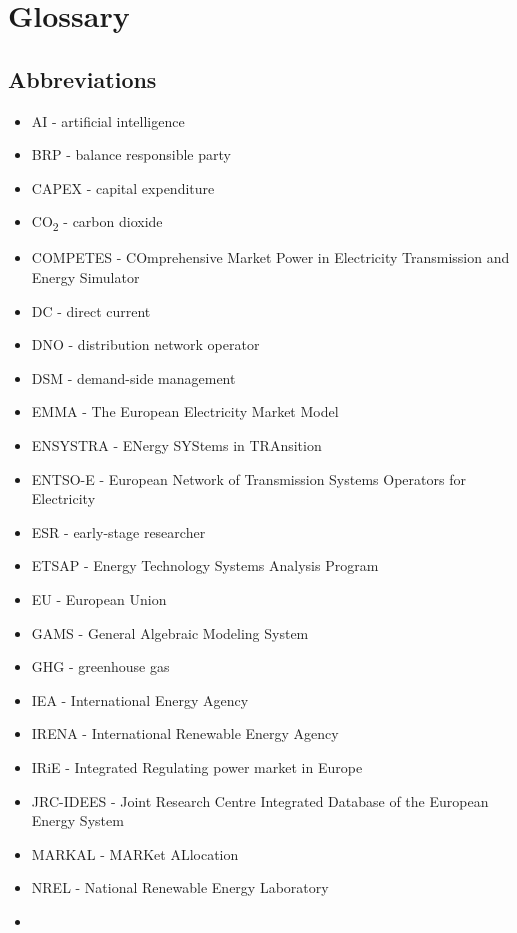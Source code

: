 \hypertarget{glossary}{%
\section{Glossary}\label{glossary}}

\hypertarget{abbreviations}{%
\subsection{Abbreviations}\label{abbreviations}}

\begin{itemize}
\tightlist
\item
  AI - artificial intelligence
\item
  BRP - balance responsible party
\item
  CAPEX - capital expenditure
\item
  CO\textsubscript{2} - carbon dioxide
\item
  COMPETES - COmprehensive Market Power in Electricity Transmission and
  Energy Simulator
\item
  DC - direct current
\item
  DNO - distribution network operator
\item
  DSM - demand-side management
\item
  EMMA - The European Electricity Market Model
\item
  ENSYSTRA - ENergy SYStems in TRAnsition
\item
  ENTSO-E - European Network of Transmission Systems Operators for
  Electricity
\item
  ESR - early-stage researcher
\item
  ETSAP - Energy Technology Systems Analysis Program
\item
  EU - European Union
\item
  GAMS - General Algebraic Modeling System
\item
  GHG - greenhouse gas
\item
  IEA - International Energy Agency
\item
  IRENA - International Renewable Energy Agency
\item
  IRiE - Integrated Regulating power market in Europe
\item
  JRC-IDEES - Joint Research Centre Integrated Database of the European
  Energy System
\item
  MARKAL - MARKet ALlocation
\item
  NREL - National Renewable Energy Laboratory
\item

\end{itemize}
